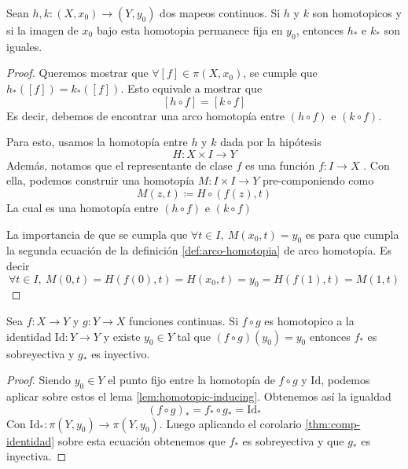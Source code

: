 \begin{lema} \label{lem:homotopic-inducing}
  Sean \(h,k : (X, x_0) \to (Y, y_0)\) dos mapeos continuos. Si \(h\) y
  \(k\) son homotopicos y si la imagen de \(x_0\) bajo esta homotopia permanece
  fija en \(y_0\), entonces \(h_*\) e \(k_*\) son iguales.
\end{lema}
\begin{proof}
  Queremos mostrar que \(\forall [f] \in \pi (X,x_0)\), se cumple que
  \(h_* ([f]) = k_* ([f])\). Esto equivale a mostrar que
  \[ [h \circ f] = [k \circ f] \]
  Es decir, debemos de encontrar una arco homotopía entre \((h \circ
  f)\) e \( (k \circ f)\).

  Para esto, usamos la homotopía entre \(h\) y \(k\) dada por la hipótesis
  \[H : X \times I \to Y \]
  Además, notamos que el representante de clase \(f\) es una función \(f
  : I \to X\) . Con ella, podemos construir una homotopía \(M : I \times I
  \to Y \) pre-componiendo como
  \[ M(z, t) \coloneqq H \circ (f(z), t) \]
  La cual es una homotopía entre \((h \circ f)\) e \((k \circ f)\)

  La importancia de que se cumpla que \( \forall t \in I,\ M (x_0, t) =
  y_0\) es para que cumpla la segunda ecuación de la definición
  \ref{def:arco-homotopia} de arco homotopía. Es decir
  \[ \forall t \in I ,\ M(0,t) = H \left( f (0), t \right) = H (x_0, t)
    = y_0 = H \left( f(1) , t \right) = M (1, t) \]
\end{proof}
\begin{teorema} \label{thm:comp-identidad-homotopia}
  Sea \(f : X \to Y\) y \(g : Y \to X\) funciones continuas. Si \(f
  \circ g\) es homotopico a la identidad \( \mathrm{Id} : Y \to Y\) y
  existe \(y_0 \in Y\) tal que \( (f \circ g ) (y_0) = y_0 \) entonces
  \(f_*\) es sobreyectiva y \(g_*\) es inyectivo.
\end{teorema}
\begin{proof}
  Siendo \(y_0 \in Y\) el punto fijo entre la homotopía de \(f \circ g\)
  y \(\mathrm{Id}\), podemos aplicar sobre estos el lema
  \ref{lem:homotopic-inducing}. Obtenemos así la igualdad
  \[ (f \circ g)_{*} = f_* \circ g_* = \mathrm{Id}_* \]
  Con \(\mathrm{Id}_* : \pi (Y, y_0) \to \pi (Y, y_0)\). Luego
  aplicando el corolario \ref{thm:comp-identidad} sobre esta ecuación
  obtenemos que \(f_*\) es sobreyectiva y que \(g_*\) es inyectiva.
\end{proof}

